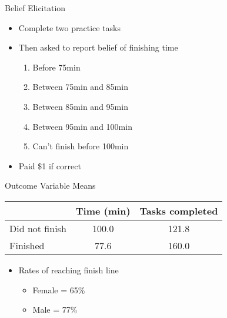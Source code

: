 \documentclass[14pt]{beamer}
\begin{document}
\begin{frame}{Belief Elicitation}
\begin{itemize}
	\item Complete two practice tasks
	\item Then asked to report belief of finishing time 
	\begin{enumerate}
		\item Before 75min 
		\item Between 75min and 85min
		\item Between 85min and 95min
		\item Between 95min and 100min
		\item Can't finish before 100min
	\end{enumerate}
	\item Paid \$1 if correct
\end{itemize}
\end{frame}

\begin{frame}{Outcome Variable Means}
\begin{table}
\begin{tabular}{lcc}
\toprule
 & Time (min) & Tasks completed \\
\midrule
Did not finish &  100.0 & 121.8 \\
Finished & 77.6 & 160.0 \\
\bottomrule
\end{tabular}
\end{table}
\begin{itemize}
	\item Rates of reaching finish line
	\begin{itemize}
		\item Female = 65\%
		\item Male = 77\%
	\end{itemize}
\end{itemize}
\end{frame}

\begin{frame}{}
\end{frame}

\begin{frame}{}
\end{frame}
\end{document}
